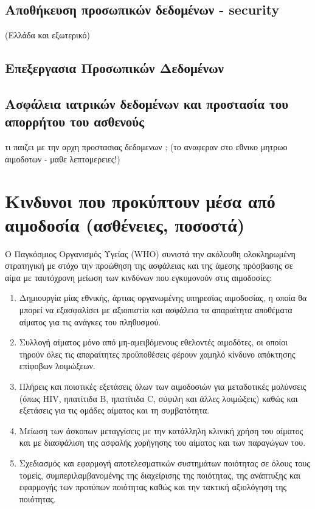 	\subsection{Αποθήκευση προσωπικών δεδομένων - security}
		(Ελλάδα και εξωτερικό)
	\subsection{Επεξεργασια Προσωπικών Δεδομένων}
	\subsection{Ασφάλεια ιατρικών δεδομένων και προστασία του απορρήτου του
ασθενούς}
		τι παιζει με την αρχη προστασιας δεδομενων ; (το αναφεραν στο εθνικο μητρωο αιμοδοτων - μαθε λεπτομερειες!)

\section{Κινδυνοι που προκύπτουν μέσα από αιμοδοσία (ασθένειες, ποσοστά)}


	Ο Παγκόσμιος Οργανισμός Υγείας (WHO) συνιστά την ακόλουθη ολοκληρωμένη στρατηγική με στόχο την προώθηση της ασφάλειας και της άμεσης πρόσβασης σε αίμα με ταυτόχρονη μείωση των κινδύνων που εγκυμονούν στις αιμοδοσίες:
	\begin{enumerate}
	\item Δημιουργία μίας εθνικής, άρτιας οργανωμένης υπηρεσίας αιμοδοσίας, η οποία θα μπορεί να εξασφαλίσει με αξιοπιστία και ασφάλεια τα απαραίτητα αποθέματα αίματος για τις ανάγκες του πληθυσμού.
	\item Συλλογή αίματος μόνο από μη-αμειβόμενους εθελοντές αιμοδότες, οι οποίοι τηρούν όλες τις απαραίτητες προϋποθέσεις φέρουν χαμηλό κίνδυνο απόκτησης επίφοβων λοιμώξεων.
	\item Πλήρεις και ποιοτικές εξετάσεις όλων των αιμοδοσιών για μεταδοτικές μολύνσεις (όπως HIV, ηπατίτιδα Β, ηπατίτιδα C, σύφιλη και άλλες λοιμώξεις)  καθώς και εξετάσεις για τις ομάδες αίματος και τη συμβατότητα.
	\item Μείωση των άσκοπων μεταγγίσεις με την κατάλληλη κλινική χρήση του αίματος και με διασφάλιση της ασφαλής χορήγησης του αίματος και των παραγώγων του.
	\item Σχεδιασμός και εφαρμογή αποτελεσματικών συστημάτων ποιότητας σε όλους τους τομείς, συμπεριλαμβανομένης της διαχείρισης της ποιότητας, της ανάπτυξης και εφαρμογής των προτύπων ποιότητας καθώς και την τακτική αξιολόγηση της ποιότητας. \cite{Bolton-Maggs2013}
\end{enumerate}

